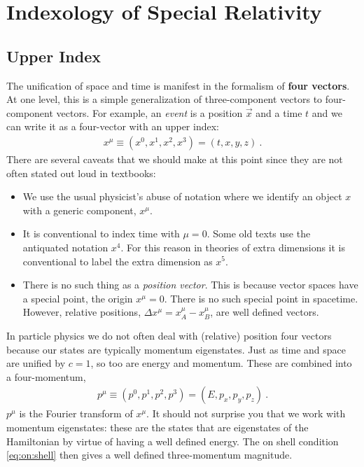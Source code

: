 \documentclass[12pt, oneside]{report}    %
\let\oldsection\section
\def\section{%
  \setcounter{sidenote}{1}%
  \oldsection
}
\begin{document}
\section{Indexology of Special Relativity}

\subsection{Upper Index}

The unification of space and time is manifest in the formalism of \textbf{four vectors}. At one level, this is a simple generalization of three-component vectors to four-component vectors. For example, an \emph{event} is a position $\vec{x}$ and a time $t$ and we can write it as a four-vector with an upper index:
\begin{align}
    x^\mu \equiv (x^0, x^1, x^2, x^3) = (t,x,y,z) \ .
\end{align}
There are several caveats that we should make at this point since they are not often stated out loud in textbooks:
\begin{itemize}
    \item We use the usual physicist's abuse of notation where we identify an object $x$ with a generic component, $x^\mu$. 
    \item It is conventional to index time with $\mu=0$. Some old texts use the antiquated notation $x^4$. For this reason in theories of extra dimensions it is conventional to label the extra dimension as $x^5$. 
    \item There is no such thing as a \emph{position vector}. This is because vector spaces have a special point, the origin $x^\mu = 0$. There is no such special point in spacetime. However, relative positions, $\Delta x^\mu = x_A^\mu - x_B^\mu$, are well defined vectors. 
\end{itemize}
In particle physics we do not often deal with (relative) position four vectors because our states are typically momentum eigenstates. Just as time and space are unified by $c=1$, so too are energy and momentum. These are combined into a four-momentum,
\begin{align}
    p^\mu \equiv (p^0, p^1, p^2, p^3) = (E, p_x, p_y, p_z) \ .
\end{align}
$p^\mu$ is the Fourier transform of $x^\mu$. It should not surprise you that we work with momentum eigenstates: these are the states that are eigenstates of the Hamiltonian by virtue of having a well defined energy. The on shell condition \eqref{eq:on:shell} then gives a well defined three-momentum magnitude.
\end{document}
